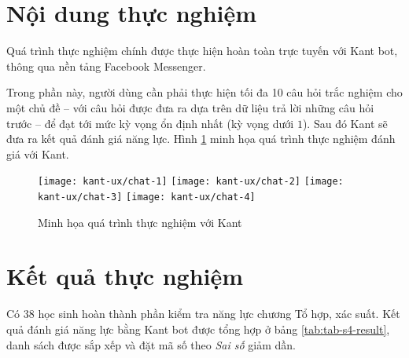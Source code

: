 \section{Nội dung thực nghiệm}
Quá trình thực nghiệm chính được thực hiện hoàn toàn trực tuyến với Kant bot, thông qua nền tảng Facebook Messenger.\par
Trong phần này, người dùng cần phải thực hiện tối đa 10 câu hỏi trắc nghiệm cho một chủ đề – với câu hỏi được đưa ra dựa trên dữ liệu trả lời những câu hỏi trước – để đạt tới mức kỳ vọng ổn định nhất (kỳ vọng dưới $1$). Sau đó Kant sẽ đưa ra kết quả đánh giá năng lực. Hình \ref{fig:fig-c4-chatbot-demo} minh họa quá trình thực nghiệm đánh giá với Kant.
\begin{figure}[htb!]\centering
	\texttt{[image: kant-ux/chat-1]}
	\texttt{[image: kant-ux/chat-2]}
	\texttt{[image: kant-ux/chat-3]}
	\texttt{[image: kant-ux/chat-4]}
	\caption{Minh họa quá trình thực nghiệm với Kant}
	\label{fig:fig-c4-chatbot-demo}
\end{figure}\par

\section{Kết quả thực nghiệm}

Có 38 học sinh hoàn thành phần kiểm tra năng lực chương Tổ hợp, xác suất. Kết quả đánh giá năng lực bằng Kant bot được tổng hợp ở bảng \ref{tab:tab-s4-result}, danh sách được sắp xếp và đặt mã số theo \textit{Sai số} giảm dần.

